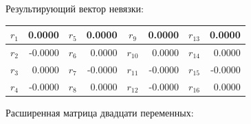 Результирующий вектор невязки:
\begin{table}[H]
\centering
\small
\begin{tabular}{|c|r||c|r||c|r||c|r|}
\hline
$r_{1}$  &  0.0000 & $r_{5}$  &  0.0000 & $r_{9}$  &  0.0000 & $r_{13}$ &  0.0000 \\ \hline
$r_{2}$  & -0.0000 & $r_{6}$  &  0.0000 & $r_{10}$ &  0.0000 & $r_{14}$ &  0.0000 \\ \hline
$r_{3}$  &  0.0000 & $r_{7}$  & -0.0000 & $r_{11}$ & -0.0000 & $r_{15}$ & -0.0000 \\ \hline
$r_{4}$  & -0.0000 & $r_{8}$  &  0.0000 & $r_{12}$ & -0.0000 & $r_{16}$ &  0.0000 \\ \hline
\end{tabular}
\end{table}

Расширенная матрица двадцати переменных:

